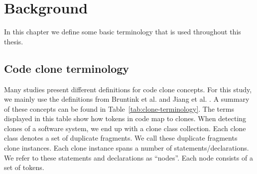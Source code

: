\chapter{Background}
\label{ch:background}
In this chapter we define some basic terminology that is used throughout this thesis.

\section{Code clone terminology}\label{sec:terminology}
Many studies present different definitions for code clone concepts. For this study, we mainly use the definitions from Bruntink et al. \cite{bruntink2005use} and Jiang et al. \cite{jiang2007deckard}. A summary of these concepts can be found in Table~\ref{tab:clone-terminology}. The terms displayed in this table show how tokens in code map to clones. When detecting clones of a software system, we end up with a clone class collection. Each clone class denotes a set of duplicate fragments. We call these duplicate fragments clone instances. Each clone instance spans a number of statements/declarations. We refer to these statements and declarations as ``nodes''. Each node consists of a set of tokens.

